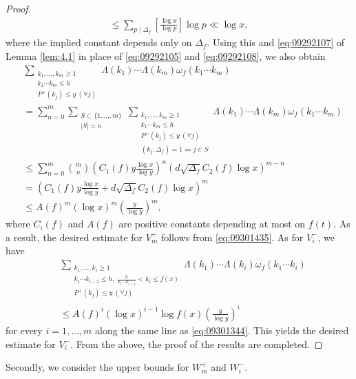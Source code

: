 \documentclass[a4paper,11pt]{amsart}
\theoremstyle{definition}
\numberwithin{equation}{section}
\begin{document}
\begin{proof}
\begin{align*}
\leq \sum_{p \mid \Delta_f} \left[\frac{\log{x}}{\log{p}}\right] \log{p}
\ll \log{x},
\end{align*}
where the implied constant depends only on $\Delta_f$.
Using this and \eqref{eq:09292107} of Lemma \ref{lem:4.1} in place of \eqref{eq:09292105} and \eqref{eq:09292108}, we also obtain
\begin{align}\label{eq:09301344}
&\sum_{\substack{k_1,\ldots,k_m \geq 1 \\ k_1 \cdots k_m \leq h \\ P^+(k_j) \leq y ~(\forall j)}} 
\Lambda(k_1) \cdots \Lambda(k_m) \omega_f(k_1 \cdots k_m) \\
&= \sum_{n=0}^{m} \sum_{\substack{S \subset \{1, \ldots, m\} \\ |S|=n}}
\sum_{\substack{k_1,\ldots,k_m \geq 1 \\ k_1 \cdots k_m \leq h \\ P^+(k_j) \leq y ~(\forall j) \\ (k_j,\Delta_f)=1 \Leftrightarrow j \in S}} 
\Lambda(k_1) \cdots \Lambda(k_m) \omega_f(k_1 \cdots k_m) \nonumber \\
&\leq \sum_{n=0}^{m} \binom{m}{n} \left(C_1(f)y\frac{\log{x}}{\log{y}}\right)^n \left(d \sqrt{\Delta_f} C_2(f) \log{x}\right)^{m-n} \nonumber\\
&= \left(C_1(f) y\frac{\log{x}}{\log{y}} 
+ d \sqrt{\Delta_f} C_2(f) \log{x}\right)^m \nonumber  \\
&\leq A(f)^m (\log{x})^m \left(\frac{y}{\log{y}}\right)^m, \nonumber 
\end{align}
where $C_i(f)$ and $A(f)$ are positive constants depending at most on $f(t)$.
As a result, the desired estimate for $V_m^+$ follows from \eqref{eq:09301435}. 
As for $V_i^-$, we have
\begin{align*}
&\sum_{\substack{k_1,\ldots,k_i \geq 1 \\ k_1 \cdots k_{i-1} \leq h,~ \frac{h}{k_1 \cdots k_{i-1}}<k_i \leq f(x) \\ P^+(k_j) \leq y ~(\forall j)}} 
\Lambda(k_1) \cdots \Lambda(k_i) \omega_f(k_1 \cdots k_i) \\
&\leq A(f)^i (\log{x})^{i-1} \log{f(x)} \left(\frac{y}{\log{y}}\right)^{i} 
\end{align*}
for every $i=1,\ldots,m$ along the same line as \eqref{eq:09301344}. 
This yields the desired estimate for $V_i^-$. 
From the above, the proof of the results are completed.
\end{proof}

Secondly, we consider the upper bounds for $W_m^+$ and $W_i^-$. 
\end{document}
